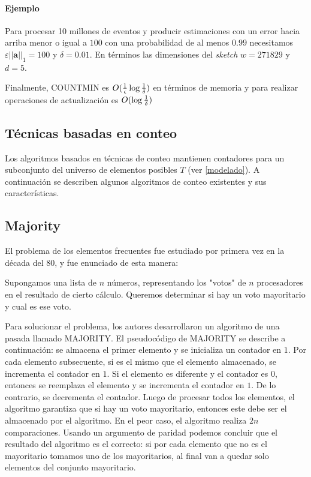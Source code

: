 \documentclass[a4paper,10pt, oneside]{article}
\begin{document}
\paragraph{Ejemplo} Para procesar 10 millones de eventos y producir estimaciones con un error hacia arriba menor o igual a $100$ con una probabilidad de al menos $0.99$ necesitamos $\varepsilon ||\mathbf{a}||_1=100$ y $\delta = 0.01$. En términos las dimensiones del \textit{sketch} $w=271829$ y $d=5$.

Finalmente, COUNTMIN es $O({1 \over \epsilon} \log {1 \over \delta})$ en términos de memoria y para realizar operaciones de actualización es $O(\log {1 \over \delta})$



\subsection{Técnicas basadas en conteo}\label{tecnicas_conteo}

Los algoritmos basados en técnicas de conteo mantienen contadores para un subconjunto del universo de elementos posibles $T$ (ver \ref{modelado}). A continuación se describen algunos algoritmos de conteo existentes y sus características.

\subsection*{Majority}
El problema de los elementos frecuentes fue estudiado por primera vez en la década del 80, y fue enunciado de esta manera:
\begin{displayquote}
	Supongamos una lista de $n$ números, representando los "votos" de $n$ procesadores en el resultado de cierto cálculo. Queremos determinar si hay un voto mayoritario y cual es ese voto.\cite{GUIBAS1981208}
\end{displayquote}

Para solucionar el problema, los autores desarrollaron un algoritmo de una pasada llamado MAJORITY. El pseudocódigo de MAJORITY se describe a continuación: se almacena el primer elemento y se inicializa un contador en $1$. Por cada elemento subsecuente, si es el mismo que el elemento almacenado, se incrementa el contador en $1$. Si el elemento es diferente y el contador es $0$, entonces se reemplaza el elemento y se incrementa el contador en $1$. De lo contrario, se decrementa el contador. Luego de procesar todos los elementos, el algoritmo garantiza que si hay un voto mayoritario, entonces este debe ser el almacenado por el algoritmo. En el peor caso, el algoritmo realiza $2n$ comparaciones. Usando un argumento de paridad podemos concluir que el resultado del algoritmo es el correcto: si por cada elemento que no es el mayoritario tomamos uno de los mayoritarios, al final van a quedar solo elementos del conjunto mayoritario.
\end{document}
